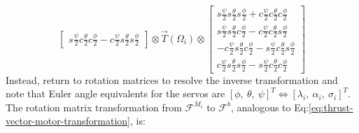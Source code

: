 \begin{subequations}
\begin{equation}
\begin{bmatrix}
s\frac{\psi}{2}c\frac{\theta}{2}c\frac{\phi}{2}-c\frac{\psi}{2}s\frac{\theta}{2}s\frac{\phi}{2}
\end{bmatrix}
\otimes
\vec{T}(\Omega_i)
\otimes
\begin{bmatrix}
s\frac{\psi}{2}s\frac{\theta}{2}s\frac{\phi}{2}+c\frac{\psi}{2}c\frac{\theta}{2}c\frac{\phi}{2}\\
s\frac{\psi}{2}s\frac{\theta}{2}c\frac{\phi}{2}-c\frac{\psi}{2}c\frac{\theta}{2}s\frac{\phi}{2}\\
-c\frac{\psi}{2}s\frac{\theta}{2}c\frac{\phi}{2}-s\frac{\psi}{2}c\frac{\theta}{2}s\frac{\phi}{2}\\
c\frac{\psi}{2}s\frac{\theta}{2}s\frac{\phi}{2}-s\frac{\psi}{2}c\frac{\theta}{2}c\frac{\phi}{2}
\end{bmatrix}
\end{equation}
\end{subequations}
Instead, return to rotation matrices to resolve the inverse transformation and note that Euler angle equivalents for the servos are $[\phi,~\theta,~\psi]^T\iff [\lambda_i,~\alpha_i,~\sigma_i]^T$. The rotation matrix transformation from $\mathcal{F}^{M_i}$ to $\mathcal{F}^b$, analogous to Eq:\ref{eq:thrust-vector-motor-transformation}, is:
